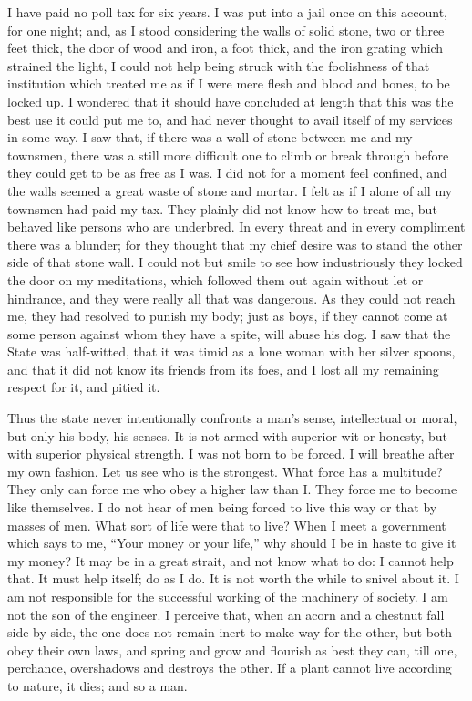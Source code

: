 \documentclass[letterpaper,12pt]{article}
\begin{document}
I have paid no poll tax for six years. I was put into a jail once on this
account, for one night; and, as I stood considering the walls of solid stone,
two or three feet thick, the door of wood and iron, a foot thick, and the iron
grating which strained the light, I could not help being struck with the
foolishness of that institution which treated me as if I were mere flesh and
blood and bones, to be locked up. I wondered that it should have concluded at
length that this was the best use it could put me to, and had never thought to
avail itself of my services in some way. I saw that, if there was a wall of
stone between me and my townsmen, there was a still more difficult one to climb
or break through before they could get to be as free as I was. I did not for
a moment feel confined, and the walls seemed a great waste of stone and mortar.
I felt as if I alone of all my townsmen had paid my tax. They plainly did not
know how to treat me, but behaved like persons who are underbred. In every
threat and in every compliment there was a blunder; for they thought that my
chief desire was to stand the other side of that stone wall.  I could not but
smile to see how industriously they locked the door on my meditations, which
followed them out again without let or hindrance, and they were really all that
was dangerous. As they could not reach me, they had resolved to punish my body;
just as boys, if they cannot come at some person against whom they have a spite,
will abuse his dog. I saw that the State was half-witted, that it was timid as
a lone woman with her silver spoons, and that it did not know its friends from
its foes, and I lost all my remaining respect for it, and pitied it.

Thus the state never intentionally confronts a man's sense, intellectual or
moral, but only his body, his senses. It is not armed with superior wit or
honesty, but with superior physical strength. I was not born to be forced.
I will breathe after my own fashion. Let us see who is the strongest. What force
has a multitude? They only can force me who obey a higher law than I. They force
me to become like themselves. I do not hear of men being forced to live this way
or that by masses of men. What sort of life were that to live? When I meet
a government which says to me, \enquote{Your money or your life,} why should
I be in haste to give it my money? It may be in a great strait, and not know
what to do: I cannot help that. It must help itself; do as I do. It is not worth
the while to snivel about it. I am not responsible for the successful working of
the machinery of society. I am not the son of the engineer. I perceive that,
when an acorn and a chestnut fall side by side, the one does not remain inert to
make way for the other, but both obey their own laws, and spring and grow and
flourish as best they can, till one, perchance, overshadows and destroys the
other. If a plant cannot live according to nature, it dies; and so a man.
\end{document}
